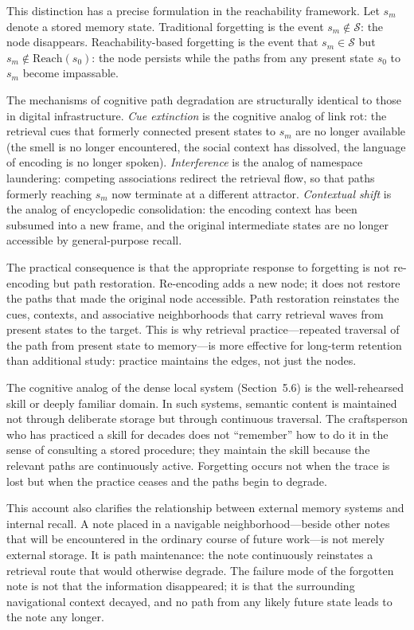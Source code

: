 \documentclass[12pt]{article}
\newcommand{\sS}{\mathcal{S}}
\newcommand{\reach}{\mathrm{Reach}}
\begin{document}
This distinction has a precise formulation in the reachability framework.
Let $s_m$ denote a stored memory state.
Traditional forgetting is the event $s_m \notin \sS$: the node disappears.
Reachability-based forgetting is the event that $s_m \in \sS$ but
$s_m \notin \reach(s_0)$: the node persists while the paths from any
present state $s_0$ to $s_m$ become impassable.

The mechanisms of cognitive path degradation are structurally identical
to those in digital infrastructure.
\emph{Cue extinction} is the cognitive analog of link rot: the retrieval
cues that formerly connected present states to $s_m$ are no longer
available (the smell is no longer encountered, the social context has
dissolved, the language of encoding is no longer spoken).
\emph{Interference} is the analog of namespace laundering: competing
associations redirect the retrieval flow, so that paths formerly reaching
$s_m$ now terminate at a different attractor.
\emph{Contextual shift} is the analog of encyclopedic consolidation:
the encoding context has been subsumed into a new frame, and the original
intermediate states are no longer accessible by general-purpose recall.

The practical consequence is that the appropriate response to forgetting
is not re-encoding but path restoration.
Re-encoding adds a new node; it does not restore the paths that made
the original node accessible.
Path restoration reinstates the cues, contexts, and associative
neighborhoods that carry retrieval waves from present states to the
target.
This is why retrieval practice---repeated traversal of the path from
present state to memory---is more effective for long-term retention
than additional study: practice maintains the edges, not just the nodes.

The cognitive analog of the dense local system (Section~5.6) is the
well-rehearsed skill or deeply familiar domain.
In such systems, semantic content is maintained not through deliberate
storage but through continuous traversal.
The craftsperson who has practiced a skill for decades does not
``remember'' how to do it in the sense of consulting a stored procedure;
they maintain the skill because the relevant paths are continuously
active.
Forgetting occurs not when the trace is lost but when the practice ceases
and the paths begin to degrade.

This account also clarifies the relationship between external memory
systems and internal recall.
A note placed in a navigable neighborhood---beside other notes that
will be encountered in the ordinary course of future work---is not
merely external storage.
It is path maintenance: the note continuously reinstates a retrieval
route that would otherwise degrade.
The failure mode of the forgotten note is not that the information
disappeared; it is that the surrounding navigational context decayed,
and no path from any likely future state leads to the note any longer.
\end{document}
